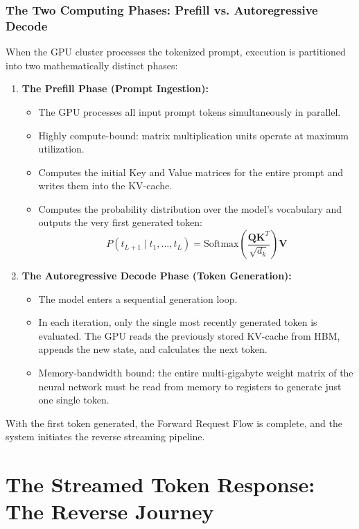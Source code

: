 \documentclass[12pt,a4paper]{report}
\begin{document}
\subsection{The Two Computing Phases: Prefill vs. Autoregressive Decode}
When the GPU cluster processes the tokenized prompt, execution is partitioned into two mathematically distinct phases:
\begin{enumerate}[leftmargin=1.2cm]
    \item \textbf{The Prefill Phase (Prompt Ingestion):}
    \begin{itemize}
        \item The GPU processes all input prompt tokens simultaneously in parallel.
        \item Highly compute-bound: matrix multiplication units operate at maximum utilization.
        \item Computes the initial Key and Value matrices for the entire prompt and writes them into the KV-cache.
        \item Computes the probability distribution over the model's vocabulary and outputs the very first generated token:
        \begin{equation}
            P(t_{L+1} \mid t_1, \dots, t_L) = \text{Softmax}\left(\frac{\mathbf{Q} \mathbf{K}^T}{\sqrt{d_k}}\right) \mathbf{V}
        \end{equation}
    \end{itemize}
    \item \textbf{The Autoregressive Decode Phase (Token Generation):}
    \begin{itemize}
        \item The model enters a sequential generation loop.
        \item In each iteration, only the single most recently generated token is evaluated. The GPU reads the previously stored KV-cache from HBM, appends the new state, and calculates the next token.
        \item Memory-bandwidth bound: the entire multi-gigabyte weight matrix of the neural network must be read from memory to registers to generate just one single token.
    \end{itemize}
\end{enumerate}

With the first token generated, the Forward Request Flow is complete, and the system initiates the reverse streaming pipeline.

\chapter{The Streamed Token Response: The Reverse Journey}
\end{document}

